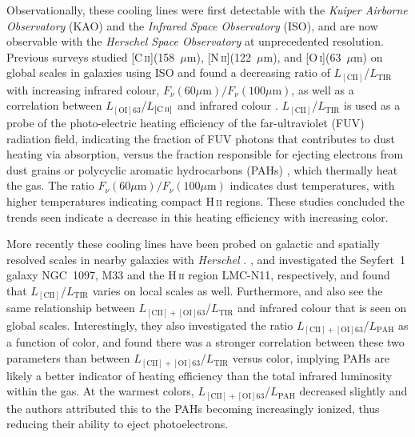 \documentclass[preprint2]{aastex}
\begin{document}
Observationally, these cooling lines were first detectable with the \emph{Kuiper Airborne Observatory} (KAO) and the \emph{Infrared Space Observatory} (ISO), and are now observable with the \emph{Herschel Space Observatory} \citep{2010A&A...518L...1P} at unprecedented resolution.  Previous surveys studied [C\,\textsc{ii}](158~$\mu$m), [N\,\textsc{ii}](122~$\mu$m), and [O\,\textsc{i}](63~$\mu$m) on global scales in galaxies using ISO and found a decreasing ratio of $L_{\mathrm{[CII]}}$/$L_{\mathrm{TIR}}$ with increasing infrared colour, $F_{\nu}(60 \mu\mathrm{m})/F_{\nu}(100 \mu\mathrm{m})$, as well as a correlation between $L_{\mathrm{[OI]63}}$/$L_{\mathrm{[C\,\textsc{ii}]}}$ and infrared colour \citep[e.g.][]{1997ApJ...491L..27M,2001ApJ...561..766M,2001A&A...375..566N,2008ApJS..178..280B}.  $L_{\mathrm{[CII]}}$/$L_{\mathrm{TIR}}$ is used as a probe of the photo-electric heating efficiency of the far-ultraviolet (FUV) radiation field, indicating the fraction of FUV photons that contributes to dust heating via absorption, versus the fraction responsible for ejecting electrons from dust grains or polycyclic aromatic hydrocarbons (PAHs) \citep{1985ApJ...291..722T, 2001ApJ...561..766M}, which thermally heat the gas.  The ratio $F_{\nu}(60 \mu\mathrm{m})/F_{\nu}(100 \mu\mathrm{m})$ indicates dust temperatures, with higher temperatures indicating compact H\,\textsc{ii} regions. These studies concluded the trends seen indicate a decrease in this heating efficiency with increasing color.

More recently these cooling lines have been probed on galactic and spatially resolved scales in nearby galaxies with \emph{Herschel} \citep[e.g.][]{2010A&A...518L..60B, 2012ApJ...751..144B, 2011ApJ...728L...7G, 2011A&A...532A.152M, 2012ApJ...747...81C, 2012A&A...544A..55B, 2012A&A...548A..91L, 2013A&A...549A.118C}.  \citet{2010A&A...518L..60B,2012ApJ...751..144B}, \citet{2011A&A...532A.152M} and \citet{2012A&A...548A..91L} investigated the Seyfert~1 galaxy NGC~1097, M33 and the H\,\textsc{ii} region LMC-N11, respectively, and found that $L_{\mathrm{[CII]}}$/$L_{\mathrm{TIR}}$ varies on local scales as well.  Furthermore, \citet{2012ApJ...747...81C} and \citet{2012A&A...548A..91L} also see the same relationship between $L_{\mathrm{[CII]+[OI]63}}$/$L_{\mathrm{TIR}}$ and infrared colour that is seen on global scales.  Interestingly, they also investigated the ratio $L_{\mathrm{[CII]+[OI]63}}$/$L_{\mathrm{PAH}}$ as a function of color, and found there was a stronger correlation between these two parameters than between $L_{\mathrm{[CII]+[OI]63}}$/$L_{\mathrm{TIR}}$ versus color, implying PAHs are likely a better indicator of heating efficiency than the total infrared luminosity within the gas.  At the warmest colors, $L_{\mathrm{[CII]+[OI]63}}$/$L_{\mathrm{PAH}}$ decreased slightly and the authors attributed this to the PAHs becoming increasingly ionized, thus reducing their ability to eject photoelectrons.
\end{document}

